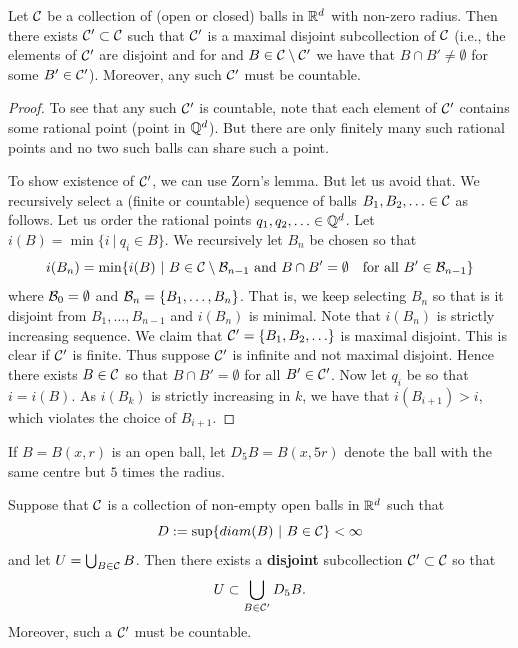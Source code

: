 \documentclass[twoside, a4paper, 10pt]{amsart}
\begin{document}
\begin{lemma} Let $\mathcal{C}$ be a collection of (open or closed) balls in $\mathbb{R}^d$ with non-zero radius. Then there exists $\mathcal{C}' \subset \mathcal{C}$ such that $\mathcal{C}'$ is a maximal disjoint subcollection of $\mathcal{C}$ (i.e., the elements of $\mathcal{C}'$ are disjoint and for and $B \in \mathcal{C} \setminus \mathcal{C}'$ we have that $B \cap B' \neq \emptyset$ for some $B' \in \mathcal{C}'$). Moreover, any such $\mathcal{C}'$ must be countable.

\end{lemma}

\begin{proof} To see that any such $\mathcal{C}'$ is countable, note that each element of $\mathcal{C}'$ contains some rational point (point in $\mathbb{Q}^d$). But there are only finitely many such rational points and no two such balls can share such a point.

To show existence of $\mathcal{C}'$, we can use Zorn's lemma. But let us avoid that. We recursively select a (finite or countable) sequence of balls $B_1, B_2, \ldots \in \mathcal{C}$ as follows. Let us order the rational points $q_1,q_2,\ldots \in \mathbb{Q}^d$. Let $i(B) = \min\{ i ~|~ q_i \in B \}$. We recursively let $B_n$ be chosen so that $$i(B_n) = \min \{ i(B) ~|~ B \in \mathcal{C} \setminus \mathcal{B}_{n-1} \text{ and } B \cap B' = \emptyset \quad \text{for all } B' \in \mathcal{B}_{n-1} \}$$ where $\mathcal{B}_0 = \emptyset$ and $\mathcal{B}_n = \{B_1, \ldots, B_n\}$. That is, we keep selecting $B_n$ so that is it disjoint from $B_1, \ldots, B_{n-1}$ and $i(B_n)$ is minimal. Note that $i(B_n)$ is strictly increasing sequence. We claim that $\mathcal{C}' = \{B_1,B_2,\ldots \}$ is maximal disjoint. This is clear if $\mathcal{C}'$ is finite. Thus suppose $\mathcal{C}'$ is infinite and not maximal disjoint. Hence there exists $B \in \mathcal{C}$ so that $B \cap B' = \emptyset$ for all $B' \in \mathcal{C}'$. Now let $q_i$ be so that $i = i(B)$. As $i(B_k)$ is strictly increasing in $k$, we have that $i(B_{i+1}) > i$, which violates the choice of $B_{i+1}$. \end{proof}

If $B = B(x, r)$ is an open ball, let $D_5 B = B(x, 5r)$ denote the ball with the same centre but $5$ times the radius. 

\begin{thm}Suppose that $\mathcal{C}$ is a collection of non-empty open balls in $\mathbb{R}^d$ such that $$D := \sup \{ diam(B) ~|~ B \in \mathcal{C} \} < \infty$$ and let $U = \bigcup_{B \in \mathcal{C}} B$. Then there exists a \textbf{disjoint} subcollection $\mathcal{C}' \subset \mathcal{C}$ so that $$U \subset \bigcup_{B \in \mathcal{C}'} D_5B.$$ Moreover, such a $\mathcal{C}'$ must be countable.

\end{thm}
\end{document}
